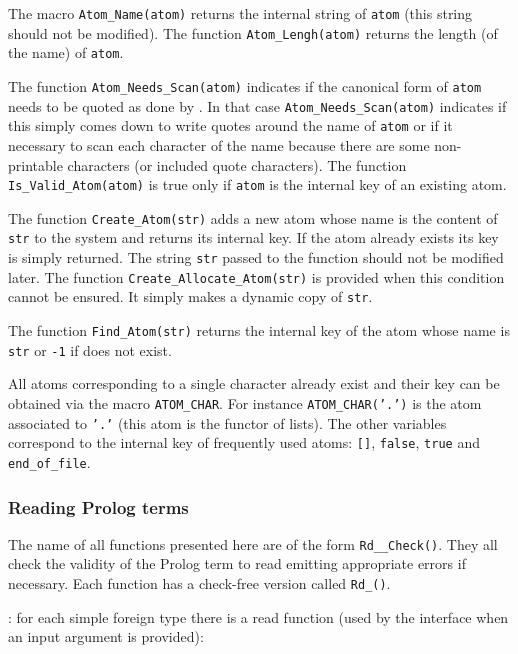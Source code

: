 The macro \texttt{Atom\_Name(atom)} returns the internal string of
\texttt{atom} (this string should not be modified). The function
\texttt{Atom\_Lengh(atom)} returns the length (of the name) of \texttt{atom}.

The function \texttt{Atom\_Needs\_Scan(atom)} indicates if the canonical form
of \texttt{atom} needs to be quoted as done by 
. In that case \texttt{Atom\_Needs\_Scan(atom)}
indicates if this simply comes down to write quotes around the name of
\texttt{atom} or if it necessary to scan each character of the name because
there are some non-printable characters (or included quote characters). The
function \texttt{Is\_Valid\_Atom(atom)} is true only if \texttt{atom} is the
internal key of an existing atom.

The function \texttt{Create\_Atom(str)} adds a new atom whose name is the
content of \texttt{str} to the system and returns its internal key. If the
atom already exists its key is simply returned. The string \texttt{str}
passed to the function should not be modified later. The function
\texttt{Create\_Allocate\_Atom(str)} is provided when this condition cannot
be ensured. It simply makes a dynamic copy of \texttt{str}. 

The function \texttt{Find\_Atom(str)} returns the internal key of the
atom whose name is \texttt{str} or \texttt{-1} if does not exist.

All atoms corresponding to a single character already exist and their
key can be obtained via the macro \texttt{ATOM\_CHAR}.  For
instance \texttt{ATOM\_CHAR('.')} is the atom associated to
\texttt{'.'} (this atom is the functor of lists). The other variables
correspond to the internal key of frequently used atoms: \texttt{[]},
\texttt{false}, \texttt{true} and \texttt{end\_of\_file}.

\subsubsection{Reading Prolog terms}
\label{Reading-Prolog-terms}
The name of all functions presented here are of the form
\texttt{Rd\_\_Check()}. They all check the validity of the
Prolog term to read emitting appropriate errors if necessary. Each function
has a check-free version called \texttt{Rd\_()}.

: for each simple foreign type
 there is a read function (used by the
interface when an input argument is provided):

